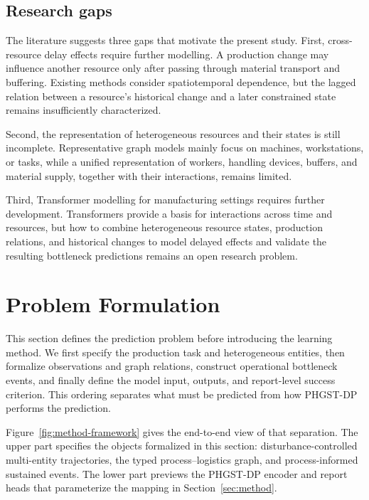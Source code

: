 \documentclass[a4paper,fleqn]{cas-dc}
\begin{document}
\subsection{Research gaps}

The literature suggests three gaps that motivate the present study. First, cross-resource delay effects require further modelling. A production change may influence another resource only after passing through material transport and buffering. Existing methods consider spatiotemporal dependence, but the lagged relation between a resource's historical change and a later constrained state remains insufficiently characterized.


Second, the representation of heterogeneous resources and their states is still incomplete. Representative graph models mainly focus on machines, workstations, or tasks, while a unified representation of workers, handling devices, buffers, and material supply, together with their interactions, remains limited.


Third, Transformer modelling for manufacturing settings requires further development. Transformers provide a basis for interactions across time and resources, but how to combine heterogeneous resource states, production relations, and historical changes to model delayed effects and validate the resulting bottleneck predictions remains an open research problem.


\section{Problem Formulation}\label{sec:problem}

This section defines the prediction problem before introducing the learning method. We first specify the production task and heterogeneous entities, then formalize observations and graph relations, construct operational bottleneck events, and finally define the model input, outputs, and report-level success criterion. This ordering separates what must be predicted from how PHGST-DP performs the prediction.


Figure~\ref{fig:method-framework} gives the end-to-end view of that separation. The upper part specifies the objects formalized in this section: disturbance-controlled multi-entity trajectories, the typed process--logistics graph, and process-informed sustained events. The lower part previews the PHGST-DP encoder and report heads that parameterize the mapping in Section~\ref{sec:method}.
\end{document}
